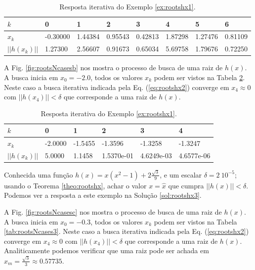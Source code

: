 \begin{table}[!h]
\centering
\begin{tabular}{|l|l|l|l|l|l|l|l|}
\hline
$k$      & 0 & 1 & 2 & 3 & 4 & 5 & 6\\ \hline
$x_k$    & -0.30000 & 1.44384 & 0.95543 & 0.42813 & 1.87298 & 1.27476 & 0.81109 \\ \hline
$||h(x_k)||$ & 1.27300 & 2.56607 & 0.91673 & 0.65034 & 5.69758 & 1.79676 & 0.72250 \\ \hline
\end{tabular}
\caption{Resposta iterativa do Exemplo \ref{ex:rootshx1}.}
\label{tab:rootsNcases1}
\end{table}

\begin{SolutionT}\label{sol:rootshx2}
A Fig. \ref{fig:rootsNcasesb} nos mostra o processo de busca de uma raiz de $h(x)$. 
A busca inicia em $x_0=-2.0$,
 todos os valores $x_{k}$ podem ser vistos na Tabela \ref{tab:rootsNcases2}. 
Neste caso a busca iterativa indicada pela Eq. (\ref{eq:rootshx2}) converge 
em $x_4\approx 0$ com $||h(x_4)||<\delta$ que corresponde a uma raiz de $h(x)$.
\end{SolutionT}

\begin{table}[!h]
\centering
\begin{tabular}{|l|l|l|l|l|l|}
\hline
$k$      & 0 & 1 & 2 & 3 & 4 \\ \hline
$x_k$    & -2.0000 & -1.5455 & -1.3596 & -1.3258 & -1.3247 \\ \hline
$||h(x_k)||$ & 5.0000 &  1.1458 & 1.5370e-01 & 4.6249e-03 & 4.6577e-06 \\ \hline
\end{tabular}
\caption{Resposta iterativa do Exemplo \ref{ex:rootshx1}.}
\label{tab:rootsNcases2}
\end{table}

\begin{example}\label{ex:rootshx2}
Conhecida uma função $h(x)=x(x^2-1)+2\frac{\sqrt{3}}{9}$, e um escalar $\delta=2~10^{-5}$;
usando o Teorema \ref{theo:rootshx},
achar o valor $x=\hat{x}$ que cumpra $||h(x)||<\delta$.
Podemos ver a resposta a este exemplo na Solução \ref{sol:rootshx3}.
\end{example}

\begin{SolutionT}\label{sol:rootshx3}
A Fig. \ref{fig:rootsNcasesc} nos mostra o processo de busca de uma raiz de $h(x)$. 
A busca inicia em $x_0=-0.3$,
 todos os valores $x_{k}$ podem ser vistos na Tabela \ref{tab:rootsNcases3}. 
Neste caso a busca iterativa indicada pela Eq. (\ref{eq:rootshx2}) converge 
em $x_4\approx 0$ com $||h(x_4)||<\delta$ que corresponde a uma raiz de $h(x)$.
Analiticamente podemos verificar que uma raiz pode ser achada em $x_m=\frac{\sqrt{3}}{3}\approx 0.57735$.
\end{SolutionT}

